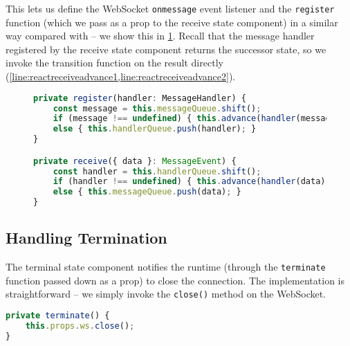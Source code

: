 This lets us define the WebSocket \texttt{onmessage} event
listener and the \texttt{register} function (which we pass as a prop
to the receive state component) in a similar way compared with
 -- we show this in \cref{lst:reactreceiveruntime}.
Recall that the message handler registered
by the receive state component returns the successor state,
so we invoke the transition function on the result directly 
(\cref{line:reactreceiveadvance1,line:reactreceiveadvance2}).

\begin{figure}[!h]
\begin{lstlisting}[language=javascript]
private register(handler: MessageHandler) {
	const message = this.messageQueue.shift();
	if (message !== undefined) { this.advance(handler(message)); } (*@\label{line:reactreceiveadvance1}@*)
	else { this.handlerQueue.push(handler); }
}

private receive({ data }: MessageEvent) {
	const handler = this.handlerQueue.shift();
	if (handler !== undefined) { this.advance(handler(data); } (*@\label{line:reactreceiveadvance2}@*)
	else { this.messageQueue.push(data); }
}
\end{lstlisting}
\label{lst:reactreceiveruntime}
\end{figure}

\subsection{Handling Termination}

The terminal state component notifies the runtime (through
the \texttt{terminate} function passed down as a prop)
to close the connection. The implementation is straightforward --
we simply invoke the \texttt{close()} method on the WebSocket.

\begin{lstlisting}[language=javascript,numbers=none]
private terminate() {
	this.props.ws.close();
}
\end{lstlisting}